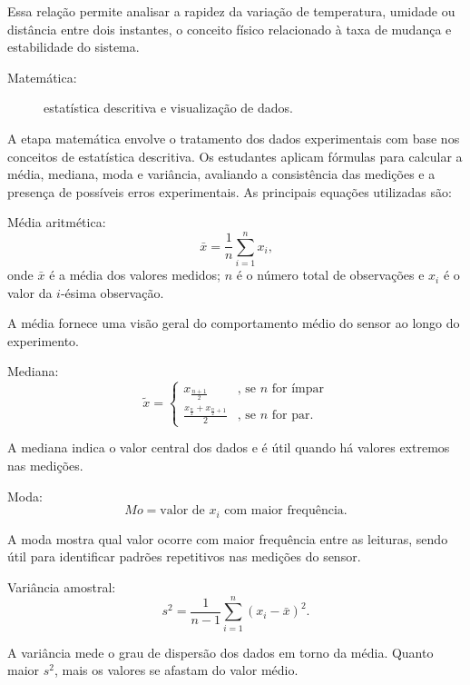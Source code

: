 \documentclass[portuguese]{textolivre}
\begin{document}
Essa relação permite analisar a rapidez da variação de temperatura, umidade ou distância entre dois instantes, o conceito físico relacionado à taxa de mudança e estabilidade do sistema.

\begin{description}
    \item[Matemática:] estatística descritiva e visualização de dados.
\end{description}

A etapa matemática envolve o tratamento dos dados experimentais com base nos conceitos de estatística descritiva. Os estudantes aplicam fórmulas para calcular a média, mediana, moda e variância, avaliando a consistência das medições e a presença de possíveis erros experimentais. As principais equações utilizadas são:

Média aritmética:
\begin{equation}
	\bar{x} = \frac{1}{n} \sum_{i=1}^{n} x_i \text{,}
\end{equation}
onde $\bar{x}$ é a média dos valores medidos; $n$ é o número total de observações e $x_i$ é o valor da $i$-ésima observação. 

A média fornece uma visão geral do comportamento médio do sensor ao longo do experimento.

Mediana:
\begin{equation}
	\tilde{x} =
	\begin{cases}
		x_{\frac{n+1}{2}} & \text{, se } n \text{ for ímpar} \\
		\frac{x_{\frac{n}{2}} + x_{\frac{n}{2}+1}}{2} & \text{, se } n \text{ for par.}
	\end{cases}
\end{equation}

A mediana indica o valor central dos dados e é útil quando há valores extremos nas medições.

Moda:
\begin{equation}
	Mo = \text{valor de } x_i \text{ com maior frequência.}
\end{equation}

A moda mostra qual valor ocorre com maior frequência entre as leituras, sendo útil para identificar padrões repetitivos nas medições do sensor.

Variância amostral:
\begin{equation}
	s^2 = \frac{1}{n-1} \sum_{i=1}^{n} (x_i - \bar{x})^2 .
\end{equation}

A variância mede o grau de dispersão dos dados em torno da média. Quanto maior $s^2$, mais os valores se afastam do valor médio.
\end{document}
